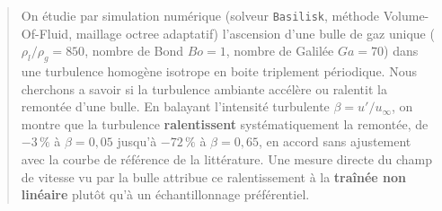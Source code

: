 \documentclass[11pt,a4paper]{article}
\begin{document}
\newpage
\begin{abstract}
\noindent
On étudie par simulation numérique (solveur \texttt{Basilisk}, méthode
Volume-Of-Fluid, maillage octree adaptatif) l'ascension d'une bulle de gaz unique
($\rho_l/\rho_g = 850$, nombre de Bond $Bo=1$, nombre de Galilée $Ga=70$) dans une
turbulence homogène isotrope en boite triplement périodique. Nous cherchons a savoir 
si la turbulence ambiante accélère ou ralentit la remontée d'une bulle. En balayant
l'intensité turbulente $\beta = u'/u_\infty$, on montre que la turbulence
\textbf{ralentissent} systématiquement la remontée, de $-3\,\%$ à $\beta=0{,}05$ jusqu'à
$-72\,\%$ à $\beta=0{,}65$, en accord sans ajustement avec la courbe de référence de la
littérature. Une mesure directe du champ de vitesse vu par la bulle attribue ce
ralentissement à la \textbf{traînée non linéaire} plutôt qu'à un échantillonnage
préférentiel.
\end{abstract}

\newpage
\tableofcontents
\newpage









\newpage


\end{document}
